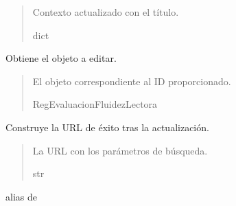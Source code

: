 \documentclass[letterpaper,10pt,spanish]{sphinxmanual}
\begin{document}
\begin{fulllineitems}
\begin{fulllineitems}
\begin{quote}
\begin{description}
\sphinxAtStartPar
Contexto actualizado con el título.

\sphinxAtStartPar
dict

\end{description}\end{quote}

\end{fulllineitems}



\begin{fulllineitems}

\pysigstartsignatures
{}
\pysigstopsignatures
\sphinxAtStartPar
Obtiene el objeto a editar.
\begin{quote}\begin{description}
\sphinxAtStartPar
El objeto correspondiente al ID proporcionado.

\sphinxAtStartPar
RegEvaluacionFluidezLectora

\end{description}\end{quote}

\end{fulllineitems}



\begin{fulllineitems}

\pysigstartsignatures
{}
\pysigstopsignatures
\sphinxAtStartPar
Construye la URL de éxito tras la actualización.
\begin{quote}\begin{description}
\sphinxAtStartPar
La URL con los parámetros de búsqueda.

\sphinxAtStartPar
str

\end{description}\end{quote}

\end{fulllineitems}



\begin{fulllineitems}

\pysigstartsignatures
{}
\pysigstopsignatures
\sphinxAtStartPar
alias de 


\end{fulllineitems}
\end{fulllineitems}
\end{document}

